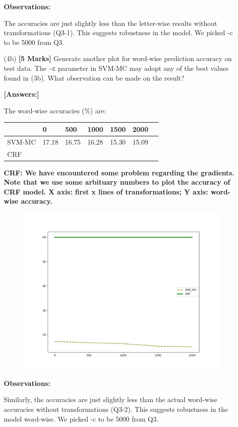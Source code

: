 \documentclass[11pt]{report}
\begin{document}
\begin{itemize}
	{\bf{Observations:}} 

	The accuracies are just slightly less than the letter-wise results without transformations (Q3-1). This suggests robustness in the model. We picked -c to be 5000 from Q3. 

	
	\item[(4b)] {\bf [5 Marks]}  Generate another plot for word-wise prediction accuracy on test data.  The \verb#-c# parameter in SVM-MC may adopt any of the best values found in (3b).
	What observation can be made on the result?

	{\bf [Answers:]} 

	The word-wise accuracies (\%) are: 
	\begin{table}[h]
	\centering
	\begin{tabular}{lllllll}
	          & 0     & 500    & 1000   & 1500  & 2000  \\ %
	\hline
	SVM-MC     & 17.18 & 16.75 & 16.28 & 15.30 & 15.09 \\ %
	CRF        &       &       &       &       &       \\
	\hline
	\end{tabular}
	\end{table}

	{\bf{CRF: We have encountered some problem regarding the gradients. Note that we use some arbituary numbers to plot the accuracy of CRF model. X axis: first x lines of transformations; Y axis: word-wise accuracy.}}

	\begin{figure}[h]
	\includegraphics[width = 10 cm]{./wordaccuracies2.png}
	\centering
	\end{figure}

	{\bf{Observations:}} 

	Similarly, the accuracies are just slightly less than the actual word-wise accuracies without transformations (Q3-2). This suggests robustness in the model word-wise. We picked -c to be 5000 from Q3. 


	
\end{itemize}
\end{document}

